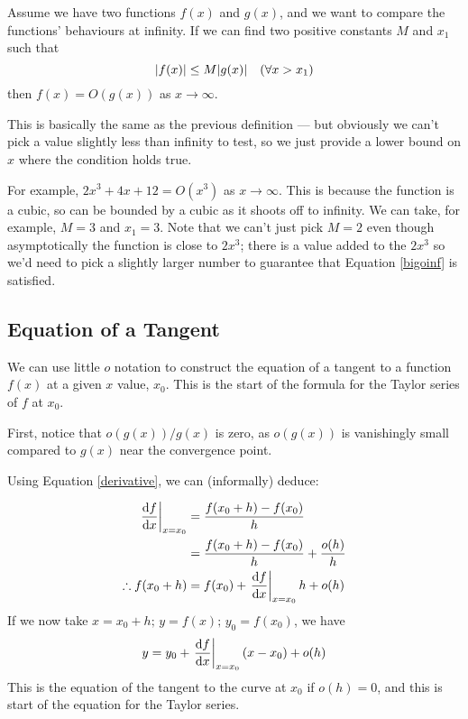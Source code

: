 \documentclass{article}
\begin{document}
\begin{definition}
    Assume we have two functions $f(x)$ and $g(x)$, and we want to compare the functions' behaviours at infinity. If we can find two positive constants $M$ and $x_1$ such that
    \begin{equation}\label{bigoinf}
        \abs{f(x)} \leq M\abs{g(x)} \quad(\forall x > x_1)
    \end{equation}
    then $f(x) = O(g(x))$ as $x \to \infty$.
\end{definition}

This is basically the same as the previous definition --- but obviously we can't pick a value slightly less than infinity to test, so we just provide a lower bound on $x$ where the condition holds true.

For example, $2x^3 + 4x + 12 = O(x^3)$ as $x \to \infty$. This is because the function is a cubic, so can be bounded by a cubic as it shoots off to infinity. We can take, for example, $M = 3$ and $x_1 = 3$. Note that we can't just pick $M=2$ even though asymptotically the function is close to $2x^3$; there is a value added to the $2x^3$ so we'd need to pick a slightly larger number to guarantee that Equation \eqref{bigoinf} is satisfied.

\subsection{Equation of a Tangent}
We can use little $o$ notation to construct the equation of a tangent to a function $f(x)$ at a given $x$ value, $x_0$. This is the start of the formula for the Taylor series of $f$ at $x_0$.

First, notice that $o(g(x))/g(x)$ is zero, as $o(g(x))$ is vanishingly small compared to $g(x)$ near the convergence point.

Using Equation \eqref{derivative}, we can (informally) deduce:

\begin{align*}
    \eval{\frac{\dd{f}}{\dd{x}}}_{x=x_0} & = \frac{f(x_0 + h) - f(x_0)}{h}                          \\
                                         & = \frac{f(x_0 + h) - f(x_0)}{h} + \frac{o(h)}{h}         \\
    \therefore f(x_0 + h)                & = f(x_0) + \eval{\frac{\dd{f}}{\dd{x}}}_{x=x_0} h + o(h)
\end{align*}
If we now take $x=x_0+h;\,y=f(x);\,y_0=f(x_0)$, we have
\[ y = y_0 + \eval{\frac{\dd{f}}{\dd{x}}}_{x=x_0}(x - x_0) + o(h) \]
This is the equation of the tangent to the curve at $x_0$ if $o(h)=0$, and this is start of the equation for the Taylor series.
\end{document}
